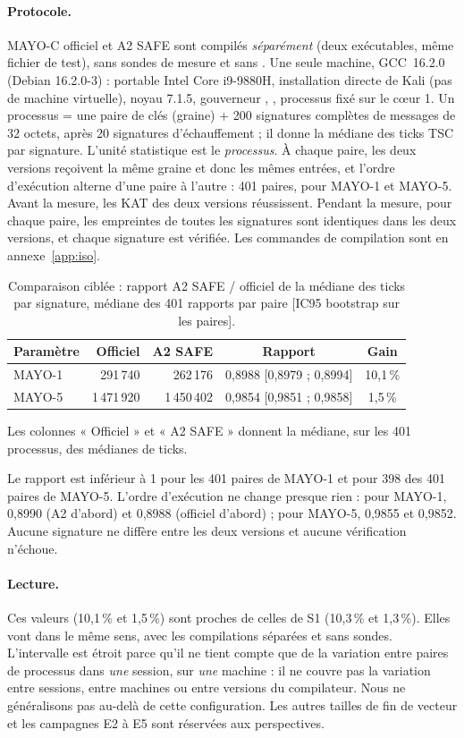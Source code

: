 \paragraph{Protocole.} MAYO-C officiel et A2 SAFE sont compilés \emph{séparément} (deux exécutables, même fichier de test), sans sondes de mesure et sans . Une seule machine, GCC~16.2.0 (Debian 16.2.0-3) : portable Intel Core i9-9880H, installation directe de Kali (pas de machine virtuelle), noyau 7.1.5, gouverneur , , processus fixé sur le cœur 1. Un processus = une paire de clés (graine) + 200 signatures complètes de messages de 32 octets, après 20 signatures d'échauffement ; il donne la médiane des ticks TSC par signature. L'unité statistique est le \emph{processus}. À chaque paire, les deux versions reçoivent la même graine et donc les mêmes entrées, et l'ordre d'exécution alterne d'une paire à l'autre : 401 paires, pour MAYO-1 et MAYO-5. Avant la mesure, les KAT des deux versions réussissent. Pendant la mesure, pour chaque paire, les empreintes de toutes les signatures sont identiques dans les deux versions, et chaque signature est vérifiée. Les commandes de compilation sont en annexe~\ref{app:iso}.
\begin{table}[ht]\centering\small
\caption{Comparaison ciblée : rapport A2 SAFE / officiel de la médiane des ticks par signature, médiane des 401 rapports par paire [IC95 bootstrap sur les paires].}\label{tab:iso}
\begin{tabular}{@{}lrrcc@{}}\toprule
Paramètre & Officiel & A2 SAFE & Rapport & Gain\\\midrule
MAYO-1 & 291\,740 & 262\,176 & 0,8988 [0,8979 ; 0,8994] & 10,1\,\%\\
MAYO-5 & 1\,471\,920 & 1\,450\,402 & 0,9854 [0,9851 ; 0,9858] & 1,5\,\%\\\bottomrule
\end{tabular}
\par\smallskip\footnotesize Les colonnes « Officiel » et « A2 SAFE » donnent la médiane, sur les 401 processus, des médianes de ticks.
\end{table}
\F{} Le rapport est inférieur à 1 pour les 401 paires de MAYO-1 et pour 398 des 401 paires de MAYO-5. L'ordre d'exécution ne change presque rien : pour MAYO-1, 0,8990 (A2 d'abord) et 0,8988 (officiel d'abord) ; pour MAYO-5, 0,9855 et 0,9852. Aucune signature ne diffère entre les deux versions et aucune vérification n'échoue.
\paragraph{Lecture.} \I{} Ces valeurs (10,1\,\% et 1,5\,\%) sont proches de celles de S1 (10,3\,\% et 1,3\,\%). Elles vont dans le même sens, avec les compilations séparées et sans sondes. L'intervalle est étroit parce qu'il ne tient compte que de la variation entre paires de processus dans \emph{une} session, sur \emph{une} machine : il ne couvre pas la variation entre sessions, entre machines ou entre versions du compilateur. Nous ne généralisons pas au-delà de cette configuration. Les autres tailles de fin de vecteur et les campagnes E2 à E5 sont réservées aux perspectives.

